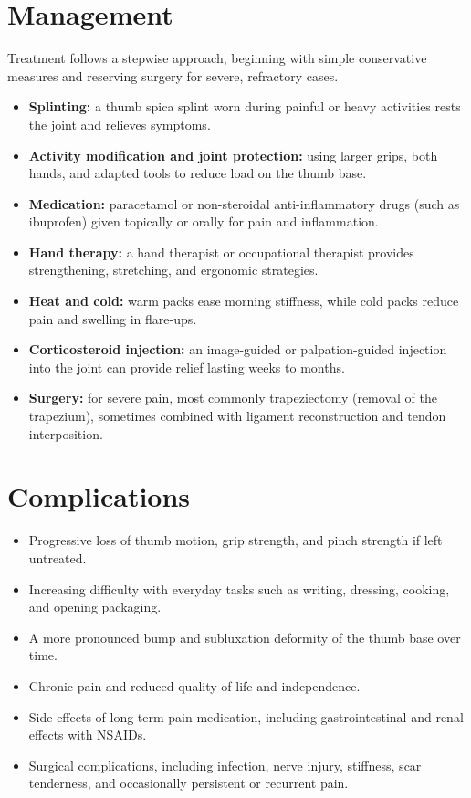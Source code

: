 \section*{Management}
Treatment follows a stepwise approach, beginning with simple conservative measures and reserving surgery for severe, refractory cases.
\begin{itemize}
    \item \textbf{Splinting:} a thumb spica splint worn during painful or heavy activities rests the joint and relieves symptoms.
    \item \textbf{Activity modification and joint protection:} using larger grips, both hands, and adapted tools to reduce load on the thumb base.
    \item \textbf{Medication:} paracetamol or non-steroidal anti-inflammatory drugs (such as ibuprofen) given topically or orally for pain and inflammation.
    \item \textbf{Hand therapy:} a hand therapist or occupational therapist provides strengthening, stretching, and ergonomic strategies.
    \item \textbf{Heat and cold:} warm packs ease morning stiffness, while cold packs reduce pain and swelling in flare-ups.
    \item \textbf{Corticosteroid injection:} an image-guided or palpation-guided injection into the joint can provide relief lasting weeks to months.
    \item \textbf{Surgery:} for severe pain, most commonly trapeziectomy (removal of the trapezium), sometimes combined with ligament reconstruction and tendon interposition.
\end{itemize}

\section*{Complications}
\begin{itemize}
    \item Progressive loss of thumb motion, grip strength, and pinch strength if left untreated.
    \item Increasing difficulty with everyday tasks such as writing, dressing, cooking, and opening packaging.
    \item A more pronounced bump and subluxation deformity of the thumb base over time.
    \item Chronic pain and reduced quality of life and independence.
    \item Side effects of long-term pain medication, including gastrointestinal and renal effects with NSAIDs.
    \item Surgical complications, including infection, nerve injury, stiffness, scar tenderness, and occasionally persistent or recurrent pain.
\end{itemize}

